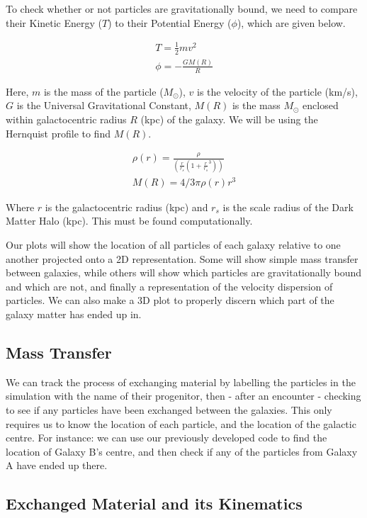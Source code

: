 \documentclass[linenumbers, ]{aastex631}
\begin{document}
To check whether or not particles are gravitationally bound, we need to compare their Kinetic Energy ($T$) to their Potential Energy ($\phi$), which are given below.

\begin{gather}
T = \frac{1}{2} mv^2 \\
\phi = -\frac{GM(R)}{R}
\end{gather}

Here, $m$ is the mass of the particle ($M_\odot$), $v$ is the velocity of the particle (km/s), $G$ is the Universal Gravitational Constant, $M(R)$ is the mass $M_\odot$ enclosed within galactocentric radius $R$ (kpc) of the galaxy. We will be using the Hernquist profile \citep{1990ApJ...356..359H} to find $M(R)$.

\begin{gather}
    \rho(r) = \frac{\rho}{(\frac{r}{r_s}(1+\frac{r}{r_s}^3))}\\
    M(R) = 4/3\pi\rho(r)r^3
\end{gather}

Where $r$ is the galactocentric radius (kpc) and $r_s$ is the scale radius of the Dark Matter Halo (kpc). This must be found computationally.

Our plots will show the location of all particles of each galaxy relative to one another projected onto a 2D representation. Some will show simple mass transfer between galaxies, while others will show which particles are gravitationally bound and which are not, and finally a representation of the velocity dispersion of particles. We can also make a 3D plot to properly discern which part of the galaxy matter has ended up in.

\subsection{Mass Transfer}

We can track the process of exchanging material by labelling the particles in the simulation with the name of their progenitor, then - after an encounter - checking to see if any particles have been exchanged between the galaxies. This only requires us to know the location of each particle, and the location of the galactic centre. For instance: we can use our previously developed code to find the location of Galaxy B's centre, and then check if any of the particles from Galaxy A have ended up there.

\subsection{Exchanged Material and its Kinematics}
\end{document}
